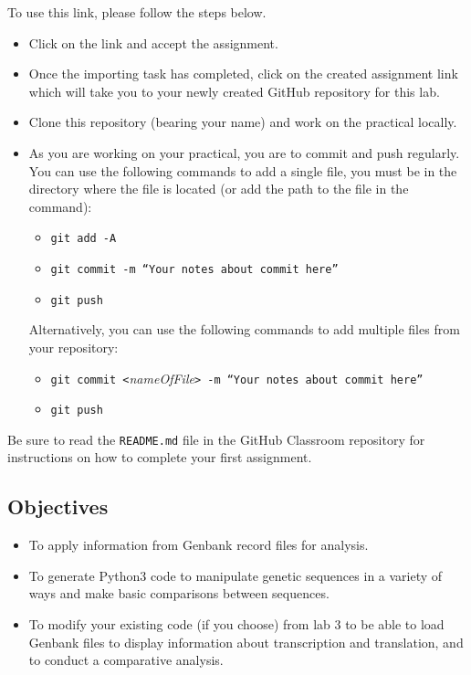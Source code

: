 To use this link, please follow the steps below.
\begin{itemize}
	\item Click on the link and accept the assignment.
	\item Once the importing task has completed, click on the created assignment link which will take you to your newly created GitHub repository for this lab.
	\item Clone this repository (bearing your name) and work on the practical locally.
	\item As you are working on your practical, you are to commit and push regularly. You can use the following commands to add a single file, you must be in the directory where the file is located (or add the path to the file in the command):
		\begin{itemize}
		\item {\tt git add -A}
		\item {\tt git commit -m ``Your notes about commit here''}
		\item {\tt git push}
	\end{itemize}

	Alternatively, you can use the following commands to add multiple files from your repository:
	\begin{itemize}
		\item {\tt git commit <}\emph{nameOfFile}\tt{> -m ``Your notes about commit here''}
		\item {\tt git push}
	\end{itemize}
\end{itemize}

Be sure to read the {\tt README.md} file in the GitHub Classroom repository for instructions on how to complete your first assignment.


\vspace*{-.1in}
\subsection*{Objectives}
\vspace*{-.1in}

\begin{itemize}
	\item To apply information from Genbank record files for analysis.
	\item To generate Python3 code to manipulate genetic sequences in a variety of ways and make basic comparisons between sequences.
	\item To modify your existing code (if you choose) from lab 3 to be able to load Genbank files to display information about transcription and translation, and to conduct a comparative analysis. 
\end{itemize}
	
